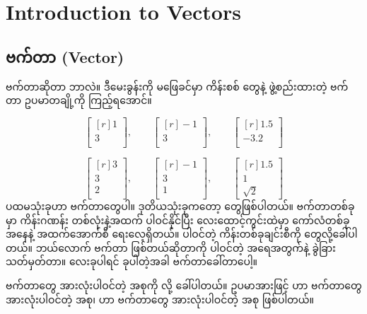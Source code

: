 \chapter{Introduction to Vectors} \label{ch:ch01}

\section{ဗက်တာ (Vector)}
 ဗက်တာဆိုတာ ဘာလဲ။ ဒီမေးခွန်းကို မဖြေခင်မှာ ကိန်းစစ်  တွေနဲ့ ဖွဲ့စည်းထားတဲ့ ဗက်တာ ဥပမာတချို့ကို ကြည့်ရအောင်။ 

\[
\begin{bmatrix*}[r] 1\\ 3\\ \end{bmatrix*}, \qquad
\begin{bmatrix*}[r] -1\\ 3\\ \end{bmatrix*}, \qquad
\begin{bmatrix*}[r] 1.5\\ -3.2\\ \end{bmatrix*}
\]

\[
\begin{bmatrix*}[r] 3\\ 3\\ 2\\\end{bmatrix*}, \qquad
\begin{bmatrix*}[r] -1\\ 3\\ 1\\\end{bmatrix*}, \qquad
\begin{bmatrix*}[r] 1.5\\ 1\\ \sqrt{2}\end{bmatrix*}
\]
ပထမသုံးခုဟာ  ဗက်တာတွေပါ။ ဒုတိယသုံးခုကတော့  တွေဖြစ်ပါတယ်။ ဗက်တာတစ်ခုမှာ ကိန်းဂဏန်း တစ်လုံးနဲ့အထက် ပါဝင်နိုင်ပြီး လေးထောင့်ကွင်းထဲမှာ ကော်လံတစ်ခုအနေနဲ့ အထက်အောက်စီ ရေးလေ့ရှိတယ်။ ပါဝင်တဲ့ ကိန်းတစ်ခုချင်းစီကို  တွေလို့ခေါ်ပါတယ်။ ဘယ်လောက်  ဗက်တာ ဖြစ်တယ်ဆိုတာကို ပါဝင်တဲ့  အရေအတွက်နဲ့ ခွဲခြားသတ်မှတ်တာ။  လေးခုပါရင်   ခုပါတဲ့အခါ  ဗက်တာခေါ်တာပေါ့။

 ဗက်တာတွေ အားလုံးပါဝင်တဲ့ အစုကို  လို့ ခေါ်ပါတယ်။ ဥပမာအားဖြင့်  ဟာ  ဗက်တာတွေ အားလုံးပါဝင်တဲ့ အစု၊  ဟာ  ဗက်တာတွေ အားလုံးပါဝင်တဲ့ အစု ဖြစ်ပါတယ်။ 

